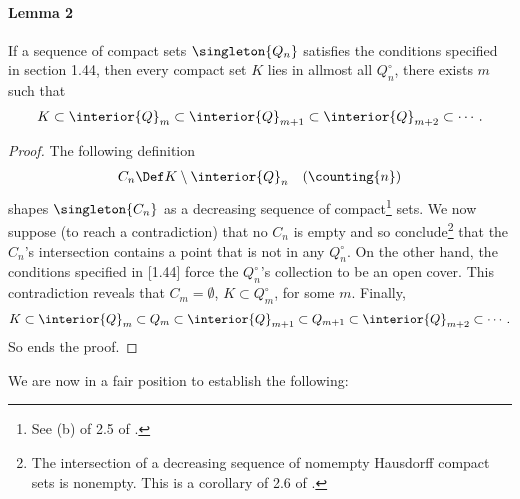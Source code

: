 \paragraph{Lemma 2} 
If a sequence of compact sets $\singleton{Q_n}$ satisfies the conditions 
specified in section 1.44, then every compact set $K$ lies in allmost all 
%
  $Q^\circ_n$, \ie
%
there exists $m$ such that 
%
  \begin{align}
    K \subset 
    \interior{Q}_m 
      \subset 
    \interior{Q}_{m+1}
      \subset
    \interior{Q}_{m+2}
      \subset
    \cdots.
  \end{align}
%
\begin{proof}
The following definition
%
  \begin{align}
    C_n \Def K \setminus \interior{Q}_n \quad (\counting{n})
  \end{align}
%
shapes $\singleton{C_n}$ as a decreasing sequence of compact\footnote{
  See (b) of 2.5 of \cite{BigRudin}.
} 
sets. We now suppose (to reach a contradiction) that 
% 
  no $C_n$ is empty 
% 
and so conclude\footnote{
  The intersection of a decreasing sequence of nomempty Hausdorff compact sets 
  is nonempty. This is a corollary of 2.6 of \cite{BigRudin}.
} 
that the $C_n$'s intersection contains a point that is not in any $Q^\circ_n$. 
On the other hand, the conditions specified in [1.44] force the 
% 
  $Q^\circ_n$'s collection  
%
to be an open cover.
% 
This contradiction reveals that 
%
  $C_m = \emptyset$, 
    \ie 
  $K \subset Q^\circ_m$, 
%  
for some $m$.
%
Finally,  
  \begin{align}
    K\subset 
    \interior{Q}_m
      \subset
    Q_m
      \subset
    \interior{Q}_{m+1}
      \subset
    Q_{m +1}
      \subset
    \interior{Q}_{m+2}
      \subset
    \cdots.
  \end{align}  
So ends the proof.
\end{proof}
\noindent We are now in a fair position to establish the following:
